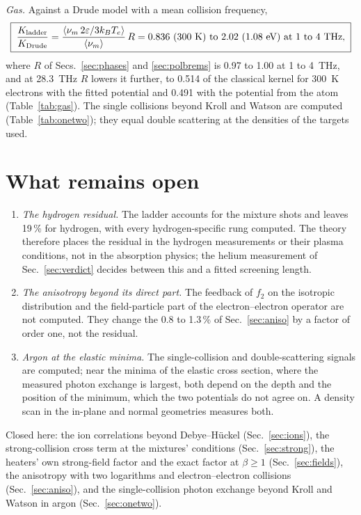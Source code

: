 \documentclass[11pt]{article}
\numberwithin{equation}{section}
\newcommand{\kB}{k_B}
\begin{document}
{\noindent}\emph{Gas.} Against a Drude model with a mean collision frequency,
\begin{equation}
\boxed{\;\frac{K_{\rm ladder}}{K_{\rm Drude}}=\frac{\langle\nu_m\,2\varepsilon/3\kB T_e\rangle}{\langle\nu_m\rangle}\,R
=0.836\ \text{(300 K)}\ \text{to}\ 2.02\ \text{(1.08 eV)}\ \text{at 1 to 4 THz},\;}
\label{eq:verdictgas}
\end{equation}
where $R$ of Secs.~\ref{sec:phases} and \ref{sec:polbrems} is 0.97 to 1.00 at 1 to 4~THz, and at 28.3~THz $R$ lowers it further, to 0.514
of the classical kernel for 300~K electrons with the fitted potential and 0.491 with the potential
from the atom (Table~\ref{tab:gas}). The single collisions beyond Kroll and Watson are computed
(Table~\ref{tab:onetwo}); they equal double scattering at the densities of the targets used.

\section{What remains open}
\label{sec:open}

\begin{enumerate}
\item \emph{The hydrogen residual.} The ladder accounts for the mixture shots and leaves 19\,\% for
hydrogen, with every hydrogen-specific rung computed. The theory therefore places the residual in
the hydrogen measurements or their plasma conditions, not in the absorption physics; the helium
measurement of Sec.~\ref{sec:verdict} decides between this and a fitted screening length.
\item \emph{The anisotropy beyond its direct part.} The feedback of $f_2$ on the isotropic
distribution and the field-particle part of the electron--electron operator are not computed. They
change the 0.8 to 1.3\,\% of Sec.~\ref{sec:aniso} by a factor of order one, not the residual.
\item \emph{Argon at the elastic minima.} The single-collision and double-scattering signals are
computed; near the minima of the elastic cross section, where the measured photon exchange is
largest, both depend on the depth and the position of the minimum, which the two potentials do not
agree on. A density scan in the in-plane and normal geometries measures both.
\end{enumerate}
Closed here: the ion correlations beyond Debye--H\"uckel (Sec.~\ref{sec:ions}), the strong-collision cross
term at the mixtures' conditions (Sec.~\ref{sec:strong}), the heaters' own strong-field factor and the exact factor at
$\beta\ge1$ (Sec.~\ref{sec:fields}), the anisotropy with two logarithms and electron--electron collisions (Sec.~\ref{sec:aniso}), and the
single-collision photon exchange beyond Kroll and Watson in argon (Sec.~\ref{sec:onetwo}).
\end{document}
